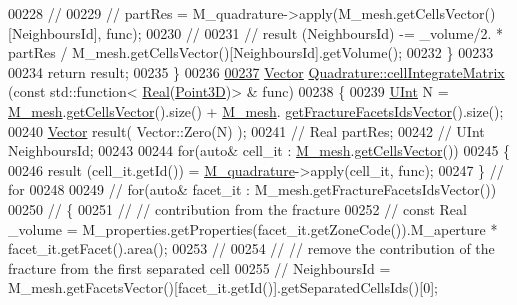 \begin{DoxyCode}
00228 \textcolor{comment}{//}
00229 \textcolor{comment}{//        partRes = M\_quadrature->apply(M\_mesh.getCellsVector()[NeighboursId], func);}
00230 \textcolor{comment}{//}
00231 \textcolor{comment}{//        result (NeighboursId) -= \_volume/2. * partRes /
       M\_mesh.getCellsVector()[NeighboursId].getVolume();}
00232     \}
00233 
00234     \textcolor{keywordflow}{return} result;
00235 \}
00236 
\hypertarget{Quadrature_8cpp_source.tex_l00237}{}\hyperlink{classFVCode3D_1_1Quadrature_ab7900923eb32ae60c817532fba2d3aac}{00237} \hyperlink{namespaceFVCode3D_a16ccf345652402bccd1a5d2e6782526c}{Vector} \hyperlink{classFVCode3D_1_1Quadrature_ab7900923eb32ae60c817532fba2d3aac}{Quadrature::cellIntegrateMatrix} (\textcolor{keyword}{const} std::function<
      \hyperlink{namespaceFVCode3D_a40c1f5588a248569d80aa5f867080e83}{Real}(\hyperlink{classFVCode3D_1_1Point3D}{Point3D})> & func)
00238 \{
00239     \hyperlink{namespaceFVCode3D_a4bf7e328c75d0fd504050d040ebe9eda}{UInt} N = \hyperlink{classFVCode3D_1_1Quadrature_abaa2519ea32065df30242bd5f5cb2d01}{M\_mesh}.\hyperlink{classFVCode3D_1_1Rigid__Mesh_afefb62f2c37317402b495e2369ed495b}{getCellsVector}().size() + \hyperlink{classFVCode3D_1_1Quadrature_abaa2519ea32065df30242bd5f5cb2d01}{M\_mesh}.
      \hyperlink{classFVCode3D_1_1Rigid__Mesh_aadbe6d9ad704122537903396d91238e0}{getFractureFacetsIdsVector}().size();
00240     \hyperlink{namespaceFVCode3D_a16ccf345652402bccd1a5d2e6782526c}{Vector} result( Vector::Zero(N) );
00241 \textcolor{comment}{//    Real partRes;}
00242 \textcolor{comment}{//    UInt NeighboursId;}
00243 
00244     \textcolor{keywordflow}{for}(\textcolor{keyword}{auto}& cell\_it : \hyperlink{classFVCode3D_1_1Quadrature_abaa2519ea32065df30242bd5f5cb2d01}{M\_mesh}.\hyperlink{classFVCode3D_1_1Rigid__Mesh_afefb62f2c37317402b495e2369ed495b}{getCellsVector}())
00245     \{
00246         result (cell\_it.getId()) = \hyperlink{classFVCode3D_1_1Quadrature_a9a128b9525429cca80435552ee3b6e56}{M\_quadrature}->apply(cell\_it, func);
00247     \} \textcolor{comment}{// for}
00248 
00249 \textcolor{comment}{//    for(auto& facet\_it : M\_mesh.getFractureFacetsIdsVector())}
00250 \textcolor{comment}{//    \{}
00251 \textcolor{comment}{//        // contribution from the fracture}
00252 \textcolor{comment}{//        const Real \_volume = M\_properties.getProperties(facet\_it.getZoneCode()).M\_aperture *
       facet\_it.getFacet().area();}
00253 \textcolor{comment}{//}
00254 \textcolor{comment}{//        // remove the contribution of the fracture from the first separated cell}
00255 \textcolor{comment}{//        NeighboursId = M\_mesh.getFacetsVector()[facet\_it.getId()].getSeparatedCellsIds()[0];}

\end{DoxyCode}
